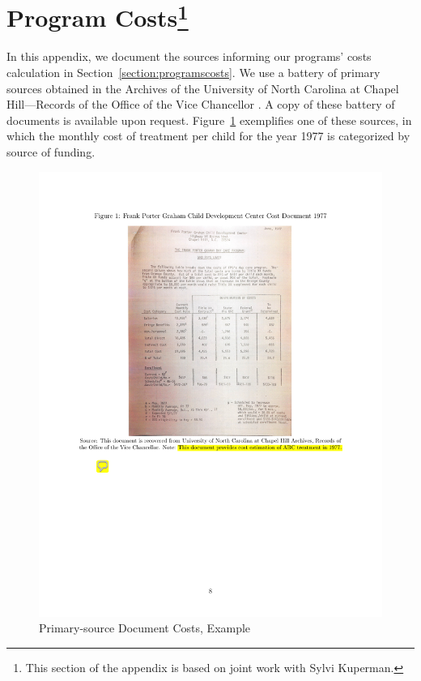 \section[Program Costs of ABC/CARE]{Program Costs\footnote{This section of the appendix is based on joint work with Sylvi Kuperman.}} \label{app:programcosts}

\noindent In this appendix, we document the sources informing our programs' costs calculation in Section~\ref{section:programscosts}. We use a battery of primary sources obtained in the Archives of the University of North Carolina at Chapel Hill---Records of the Office of the Vice Chancellor \citet{UNC-Archives_Health-Affairs}. A copy of these battery of documents is available upon request. Figure~\ref{figure:who} exemplifies one of these sources, in which the monthly cost of treatment per child for the year 1977 is categorized by source of funding.

\begin{center}
\begin{figure}[H] 
\caption{Primary-source Document Costs, Example}
\label{figure:who}
\centering
\includegraphics[width=.9\columnwidth]{AppOutput/Program/UNC-costs.pdf}
\end{figure}
\end{center}

